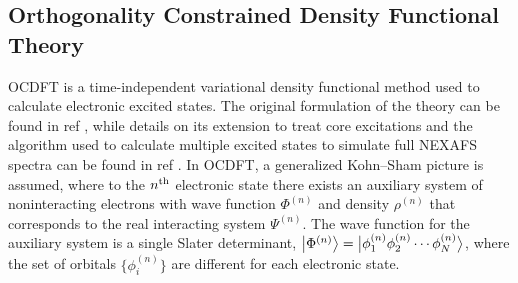 \documentclass{article}
\begin{document}
\subsection*{Orthogonality Constrained Density Functional Theory}
OCDFT is a time-independent variational density functional method \cite{ayers_time-independent_2012} used to calculate electronic excited states. The original formulation of the theory can be found in ref , while details on its extension to treat core excitations and the algorithm used to calculate multiple excited states to simulate full NEXAFS spectra can be found in ref .  
In OCDFT, a generalized Kohn--Sham picture is assumed, where to the $n^{\rm th}$ electronic state there exists an auxiliary system of noninteracting electrons with wave function $\Phi^{(n)}$ and density $\rho^{(n)}$ that corresponds to the real interacting system $\Psi^{(n)}$.
The wave function for the auxiliary system is a single Slater determinant, $\ket{\Phi^{(n)}} = \ket[1]{\phi_1^{(n)}\phi_2^{(n)} \cdots\phi_N^{(n)}}$, where the set of orbitals $\{\phi_i^{(n)}\}$ are different for each electronic state.
\end{document}
